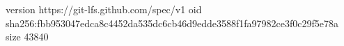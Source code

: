 version https://git-lfs.github.com/spec/v1
oid sha256:fbb953047edca8c4452da535dc6cb46d9edde3588f1fa97982ce3f0c29f5e78a
size 43840
